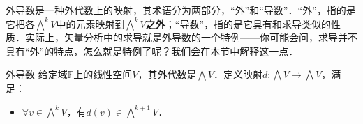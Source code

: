 

外导数是一种外代数上的映射，其术语分为两部分，“外”和“导数”．“外”，指的是它把各$\bigwedge^k V$中的元素映射到$\bigwedge^k V$\textbf{之外}；“导数”，指的是它具有和求导类似的性质．实际上，矢量分析中的求导就是外导数的一个特例——你可能会问，求导并不具有“外”的特点，怎么就是特例了呢？我们会在本节中解释这一点．

\begin{definition}{外导数}
给定域$\mathbb{F}$上的线性空间$V$，其外代数是$\bigwedge V$．定义映射$d:\bigwedge V\rightarrow\bigwedge V$，满足：
\begin{itemize}
\item $\forall v\in\bigwedge^kV$，有$d(v)\in\bigwedge^{k+1}V$．
\end{itemize}



\end{definition}






